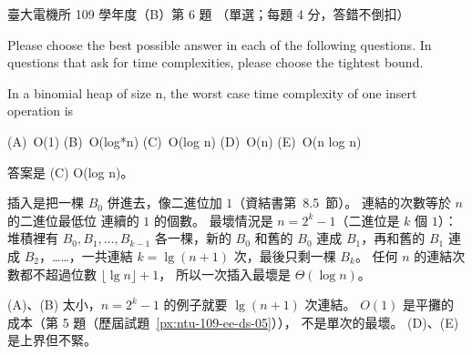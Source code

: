 \begin{pastexam}[label={px:ntu-109-ee-ds-06}]{臺大電機所 109 學年度（B）第 6 題}
（單選；每題 4 分，答錯不倒扣）

Please choose the best possible answer in each of the following questions. In questions that ask
for time complexities, please choose the tightest bound.

In a binomial heap of size n, the worst case time complexity of one insert operation is

(A)~O(1) \qquad (B)~O(log*n) \qquad (C)~O(log n) \qquad (D)~O(n) \qquad (E)~O(n log n)
\end{pastexam}

\begin{pastsoln}
答案是 (C) O(log n)。

插入是把一棵 $B_0$ 併進去，像二進位加 $1$（資結書第~8.5~節）。 連結的次數等於 $n$ 的二進位最低位
連續的 $1$ 的個數。 最壞情況是 $n = 2^k - 1$（二進位是 $k$ 個 $1$）：堆積裡有 $B_0, B_1, \ldots,
B_{k-1}$ 各一棵，新的 $B_0$ 和舊的 $B_0$ 連成 $B_1$，再和舊的 $B_1$ 連成 $B_2$，……，一共連結 $k =
\lg(n + 1)$ 次，最後只剩一棵 $B_k$。 任何 $n$ 的連結次數都不超過位數 $\lfloor \lg n \rfloor + 1$，
所以一次插入最壞是 $\Theta(\log n)$。

(A)、(B) 太小，$n = 2^k - 1$ 的例子就要 $\lg(n+1)$ 次連結。 $O(1)$ 是平攤的成本（第 5 題（歷屆試題~\ref{px:ntu-109-ee-ds-05}）），
不是單次的最壞。 (D)、(E) 是上界但不緊。
\end{pastsoln}
